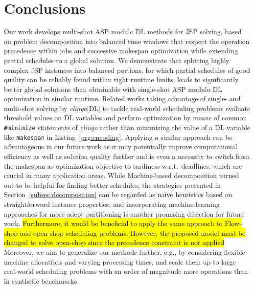 \documentclass{tlp} %
\newcommand{\clingo}{\emph{clingo}\xspace}
\newcommand{\clingodl}{\emph{clingo}[DL]\xspace}
\begin{document}
\section{Conclusions}\label{sec:conclusions}
%
Our work develops multi-shot ASP modulo DL methods for JSP solving,
based on problem decomposition into balanced time windows that respect the operation
precedence within jobs and successive makespan optimization while extending
partial schedules to a global solution.
We demonstrate that splitting highly complex JSP instances into
balanced portions, for which partial schedules of good quality can be reliably
found within tight runtime limits, leads to significantly better global solutions
than obtainable with single-shot ASP modulo DL optimization in similar runtime.
Related works taking advantage of single- \citep{abjoossctowa21a}
and multi-shot solving \citep{francescutto2021solving} by
\clingodl to tackle real-world scheduling problems evaluate threshold values
on DL variables and perform optimization by means of common 
\lstinline{#minimize} statements of \clingo rather than minimizing the
value of a DL variable like \lstinline{makespan} in Listing~\ref{prg:encoding}.
Applying a similar approach can be advantageous in our future work as it may
potentially improve computational efficiency as well as solution quality further
and is even a necessity to switch from the makespan as optimization objective to tardiness
w.r.t.\ deadlines, which are crucial in many application areas.
While Machine-based decomposition turned out to be helpful
for finding better schedules, the strategies presented in Section~\ref{subsec:decomposition}
can be regarded as naive heuristics based on straightforward instance properties,
and incorporating machine-learning approaches \citep{elscge22a,tagesc21a}
for more adept partitioning is another promising direction for future work.
\hl{Furthermore, it would be beneficial to apply the same approach to Flow-shop and open-shop scheduling problems. However, the proposed model must be changed to solve open-shop since the precedence constraint is not applied}
Moreover, we aim to generalize our methods further, e.g.,
by considering flexible machine allocations and varying processing times,
and scale them up to large real-world scheduling problems with an order of magnitude more
operations than in synthetic benchmarks.
%
\end{document}
